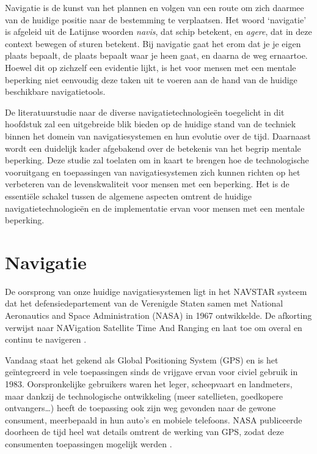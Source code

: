 

Navigatie is de kunst van het plannen en volgen van een route om zich daarmee van de huidige positie naar de bestemming te verplaatsen. Het woord `navigatie' is afgeleid uit de Latijnse woorden \textit{navis}, dat schip betekent, en \textit{agere}, dat in deze context bewegen of sturen betekent. Bij navigatie gaat het erom dat je je eigen plaats bepaalt, de plaats bepaalt waar je heen gaat, en daarna de weg ernaartoe. Hoewel dit op zichzelf een evidentie lijkt, is het voor mensen met een mentale beperking niet eenvoudig deze taken uit te voeren aan de hand van de huidige beschikbare navigatietools.

De literatuurstudie naar de diverse navigatietechnologieën toegelicht in dit hoofdstuk zal een uitgebreide blik bieden op de huidige stand van de techniek binnen het domein van navigatiesystemen en hun evolutie over de tijd. Daarnaast wordt een duidelijk kader afgebakend over de betekenis van het begrip mentale beperking. Deze studie zal toelaten om in kaart te brengen hoe de technologische vooruitgang en toepassingen van navigatiesystemen zich kunnen richten op het verbeteren van de levenskwaliteit voor mensen met een beperking. Het is de essentiële schakel tussen de algemene aspecten omtrent de huidige navigatietechnologieën en de implementatie ervan voor mensen met een mentale beperking.

\section{Navigatie}
\label{sec:navigatie}

De oorsprong van onze huidige navigatiesystemen ligt in het NAVSTAR systeem dat het defensiedepartement van de Verenigde Staten samen met National Aeronautics and Space Administration (NASA) in 1967 ontwikkelde. De afkorting verwijst naar NAVigation Satellite Time And Ranging en laat toe om overal en continu te navigeren \autocite{Bowditch2002}. 

Vandaag staat het gekend als Global Positioning System (GPS) en is het geïntegreerd in vele toepassingen sinds de vrijgave ervan voor civiel gebruik in 1983. Oorspronkelijke gebruikers waren het leger, scheepvaart en landmeters, maar dankzij de technologische ontwikkeling (meer satellieten, goedkopere ontvangers\ldots) heeft de toepassing ook zijn weg gevonden naar de gewone consument, meerbepaald in hun auto's en mobiele telefoons. NASA publiceerde doorheen de tijd heel wat details omtrent de werking van GPS, zodat deze consumenten toepassingen mogelijk werden \autocite{Zaidman2008}. 

